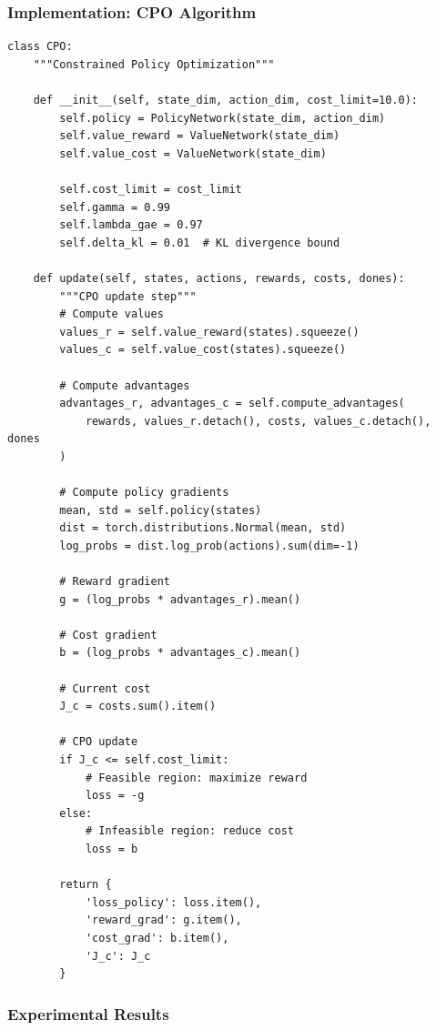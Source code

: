 \documentclass[12pt]{article}
\begin{document}
{{{{\subsubsection{Implementation: CPO Algorithm}

\begin{verbatim}
class CPO:
    """Constrained Policy Optimization"""
    
    def __init__(self, state_dim, action_dim, cost_limit=10.0):
        self.policy = PolicyNetwork(state_dim, action_dim)
        self.value_reward = ValueNetwork(state_dim)
        self.value_cost = ValueNetwork(state_dim)
        
        self.cost_limit = cost_limit
        self.gamma = 0.99
        self.lambda_gae = 0.97
        self.delta_kl = 0.01  # KL divergence bound
    
    def update(self, states, actions, rewards, costs, dones):
        """CPO update step"""
        # Compute values
        values_r = self.value_reward(states).squeeze()
        values_c = self.value_cost(states).squeeze()
        
        # Compute advantages
        advantages_r, advantages_c = self.compute_advantages(
            rewards, values_r.detach(), costs, values_c.detach(), dones
        )
        
        # Compute policy gradients
        mean, std = self.policy(states)
        dist = torch.distributions.Normal(mean, std)
        log_probs = dist.log_prob(actions).sum(dim=-1)
        
        # Reward gradient
        g = (log_probs * advantages_r).mean()
        
        # Cost gradient
        b = (log_probs * advantages_c).mean()
        
        # Current cost
        J_c = costs.sum().item()
        
        # CPO update
        if J_c <= self.cost_limit:
            # Feasible region: maximize reward
            loss = -g
        else:
            # Infeasible region: reduce cost
            loss = b
        
        return {
            'loss_policy': loss.item(),
            'reward_grad': g.item(),
            'cost_grad': b.item(),
            'J_c': J_c
        }
\end{verbatim}

\subsubsection{Experimental Results}

}}}}
\end{document}
